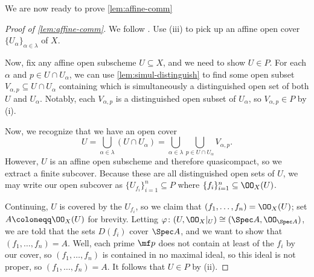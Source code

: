 \documentclass[../notes.tex]{subfiles}
\begin{document}
We are now ready to prove \autoref{lem:affine-comm}
\begin{proof}[Proof of \autoref{lem:affine-comm}]
	We follow \cite[Lemma~5.3.2]{rising-sea}. Use (iii) to pick up an affine open cover $\{U_\alpha\}_{\alpha\in\lambda}$ of $X$.
	
	Now, fix any affine open subscheme $U\subseteq X$, and we need to show $U\in P$. For each $\alpha$ and $p\in U\cap U_\alpha$, we can use \autoref{lem:simul-distinguish} to find some open subset $V_{\alpha,p}\subseteq U\cap U_\alpha$ containing which is simultaneously a distinguished open set of both $U$ and $U_\alpha$. Notably, each $V_{\alpha,p}$ is a distinguished open subset of $U_\alpha$, so $V_{\alpha,p}\in P$ by (i).

	Now, we recognize that we have an open cover
	\[U=\bigcup_{\alpha\in\lambda}(U\cap U_\alpha)=\bigcup_{\alpha\in\lambda}\bigcup_{p\in U\cap U_\alpha}V_{\alpha,p}.\]
	However, $U$ is an affine open subscheme and therefore quasicompact, so we extract a finite subcover. Because these are all distinguished open sets of $U$, we may write our open subcover as $\{U_{f_i}\}_{i=1}^n\subseteq P$ where $\{f_i\}_{i=1}^n\subseteq\OO_X(U)$.
	
	Continuing, $U$ is covered by the $U_{f_i}$, so we claim that $(f_1,\ldots,f_n)=\OO_X(U)$; set $A\coloneqq\OO_X(U)$ for brevity. Letting $\varphi\colon(U,\OO_X|_U)\cong(\Spec A,\OO_{\Spec A})$, we are told that the sets $D(f_i)$ cover $\Spec A$, and we want to show that $(f_1,\ldots,f_n)=A$. Well, each prime $\mf p$ does not contain at least of the $f_i$ by our cover, so $(f_1,\ldots,f_n)$ is contained in no maximal ideal, so this ideal is not proper, so $(f_1,\ldots,f_n)=A$. It follows that $U\in P$ by (ii).
\end{proof}
\end{document}
